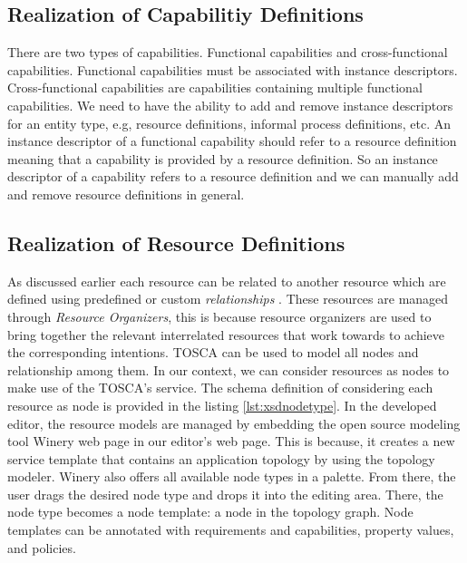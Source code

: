 \subsection{Realization of Capabilitiy Definitions}
There are two types of capabilities. Functional capabilities and cross-functional capabilities. Functional capabilities must be associated with instance descriptors. Cross-functional capabilities are capabilities containing multiple functional capabilities. We need to have the ability to add and remove instance descriptors for an entity type, e.g, resource definitions,  informal process definitions, etc. An instance descriptor of a functional capability should refer to a resource definition meaning that a capability is provided by a resource definition. So an instance descriptor of a capability refers to a resource definition and we can manually add and remove resource definitions in general.




\subsection{Realization of Resource Definitions}
As discussed earlier each resource can be related to another resource which are defined using predefined or custom \textit{relationships} \cite{Sungur2014a}. These resources are managed through \textit{Resource Organizers}, this is because resource organizers are used to bring together the relevant interrelated resources that work towards to achieve the corresponding intentions. TOSCA \cite{Binz2014} can be used to model all nodes and relationship among them. In our context, we can consider resources as nodes to make use of the TOSCA's service. The schema definition of considering each resource as node is provided in the listing \ref{lst:xsdnodetype}. In the developed editor, the resource models are managed by embedding  the open source modeling tool Winery web page \cite{Kopp2013} in our editor's web page. This is because, it creates a new service template that contains an application topology by using the topology modeler. Winery also offers all available node types in a palette. From there, the user drags the desired node type and drops it into the editing area. There, the node type
becomes a node template: a node in the topology graph. Node templates can be annotated with requirements and capabilities, property values, and policies. 

